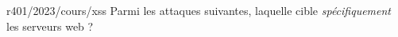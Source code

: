 \begin{question}{r401/2023/cours/xss}
  Parmi les attaques suivantes, laquelle cible {\em spécifiquement}
  les serveurs web ?
  \begin{reponseshoriz}
  \end{reponseshoriz}
\end{question}
